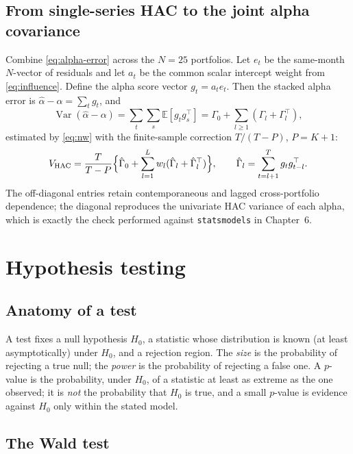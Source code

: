 \subsection{From single-series HAC to the joint alpha covariance}

Combine \eqref{eq:alpha-error} across the $N=25$ portfolios. Let $e_t$ be
the same-month $N$-vector of residuals and let $a_t$ be the common scalar
intercept weight from \eqref{eq:influence}. Define the alpha score vector
$g_t=a_t e_t$. Then the stacked alpha error is
$\hat\alpha-\alpha=\sum_t g_t$, and
\begin{equation}
\operatorname{Var}(\hat\alpha-\alpha)=\sum_{t}\sum_{s}\mathbb{E}[g_t g_s^{\top}]
=\Gamma_0+\sum_{l\ge 1}(\Gamma_l+\Gamma_l^{\top}),
\end{equation}
estimated by \eqref{eq:nw} with the finite-sample correction
$T/(T-P)$, $P=K+1$:
\begin{equation}\label{eq:jointhac}
V_{\mathrm{HAC}}=\frac{T}{T-P}\Bigl\{\hat\Gamma_0+\sum_{l=1}^{L}w_l(\hat\Gamma_l+\hat\Gamma_l^{\top})\Bigr\},
\qquad \hat\Gamma_l=\sum_{t=l+1}^{T}g_t g_{t-l}^{\top}.
\end{equation}
The off-diagonal entries retain contemporaneous and lagged
cross-portfolio dependence; the diagonal reproduces the univariate HAC
variance of each alpha, which is exactly the check performed against
\texttt{statsmodels} in Chapter~6.

\section{Hypothesis testing}\label{prelim-tests}

\subsection{Anatomy of a test}

A test fixes a null hypothesis $H_0$, a statistic whose distribution is
known (at least asymptotically) under $H_0$, and a rejection region. The
\emph{size} is the probability of rejecting a true null; the \emph{power}
is the probability of rejecting a false one. A $p$-value is the
probability, under $H_0$, of a statistic at least as extreme as the one
observed; it is \emph{not} the probability that $H_0$ is true, and a small
$p$-value is evidence against $H_0$ only within the stated model.

\subsection{The Wald test}

